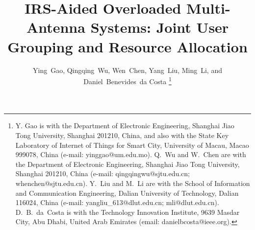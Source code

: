 \documentclass[12pt,draftclsnofoot, onecolumn]{IEEEtran}
\theoremstyle{plain}
\begin{document}
\begin{sloppypar}	
\title{IRS-Aided Overloaded Multi-Antenna Systems: Joint User Grouping and Resource Allocation} 
\author{Ying~Gao, Qingqing~Wu, Wen~Chen, Yang~Liu,  Ming~Li, and Daniel~Benevides~da Costa \vspace{-1.5cm}%
\thanks{Y. Gao is with the Department of Electronic Engineering, Shanghai Jiao Tong University, Shanghai 201210, China, and also with the State Key Laboratory of Internet of Things for Smart City, University of Macau, Macao 999078, China (e-mail: yinggao@um.edu.mo). Q.~Wu and W.~Chen are with the Department of Electronic Engineering, Shanghai Jiao Tong University, Shanghai 201210, China (e-mail: qingqingwu@sjtu.edu.cn; whenchen@sjtu.edu.cn).  Y.~Liu and M.~Li are with the School of Information and Communication Engineering, Dalian University of Technology, Dalian 116024, China (e-mail: yangliu\_613@dlut.edu.cn; mli@dlut.edu.cn). D.~B.~da~Costa is with the Technology Innovation Institute, 9639 Masdar City, Abu Dhabi, United Arab Emirates (email: danielbcosta@ieee.org).}}%

\maketitle


\end{sloppypar}
\end{document}
